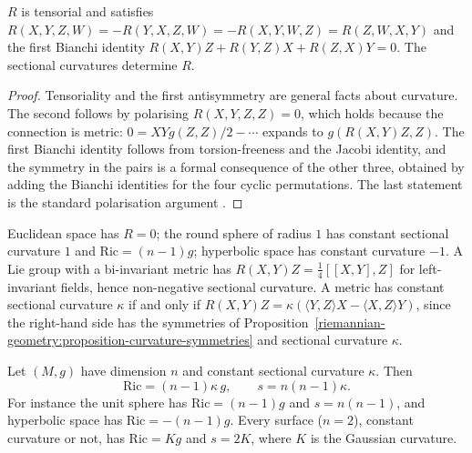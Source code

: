 \begin{proposition}\label{riemannian-geometry:proposition-curvature-symmetries}
$R$ is tensorial and satisfies $R(X, Y, Z, W) = -R(Y, X, Z, W) = -R(X, Y, W, Z) = R(Z, W, X, Y)$ and the first Bianchi identity
$R(X, Y)Z + R(Y, Z)X + R(Z, X)Y = 0$. The sectional curvatures determine $R$.
\end{proposition}

\begin{proof}
Tensoriality and the first antisymmetry are general facts about curvature. The second follows by polarising $R(X, Y, Z, Z) = 0$, which holds because the connection is metric:
$0 = XY g(Z,Z)/2 - \cdots$ expands to $g(R(X,Y)Z, Z)$. The first Bianchi identity follows from torsion-freeness and the Jacobi identity, and the symmetry in the pairs is a formal consequence of the other
three, obtained by adding the Bianchi identities for the four cyclic permutations. The last statement is the standard polarisation argument \cite[Chapter 4]{do-carmo-riemannian}.
\end{proof}

\begin{example}\label{riemannian-geometry:example-curvature}
Euclidean space has $R = 0$; the round sphere of radius $1$ has constant sectional curvature $1$ and $\mathrm{Ric} = (n-1)g$; hyperbolic space has constant curvature $-1$. A Lie group with a bi-invariant
metric has $R(X, Y)Z = \frac14[[X, Y], Z]$ for left-invariant fields, hence non-negative sectional curvature. A metric has constant sectional curvature $\kappa$ if and only if
$R(X, Y)Z = \kappa(\langle Y, Z\rangle X - \langle X, Z\rangle Y)$, since the right-hand side has the symmetries of Proposition~\ref{riemannian-geometry:proposition-curvature-symmetries} and sectional curvature $\kappa$.
\end{example}

\begin{proposition}\label{riemannian-geometry:proposition-ricci-constant-curvature}
Let $(M, g)$ have dimension $n$ and constant sectional curvature $\kappa$. Then
\[
\mathrm{Ric} = (n - 1)\kappa\,g, \qquad s = n(n - 1)\kappa .
\]
For instance the unit sphere has $\mathrm{Ric} = (n - 1)g$ and $s = n(n - 1)$, and hyperbolic space has $\mathrm{Ric} = -(n - 1)g$. Every surface ($n = 2$), constant curvature or not,
has $\mathrm{Ric} = Kg$ and $s = 2K$, where $K$ is the Gaussian curvature.
\end{proposition}

